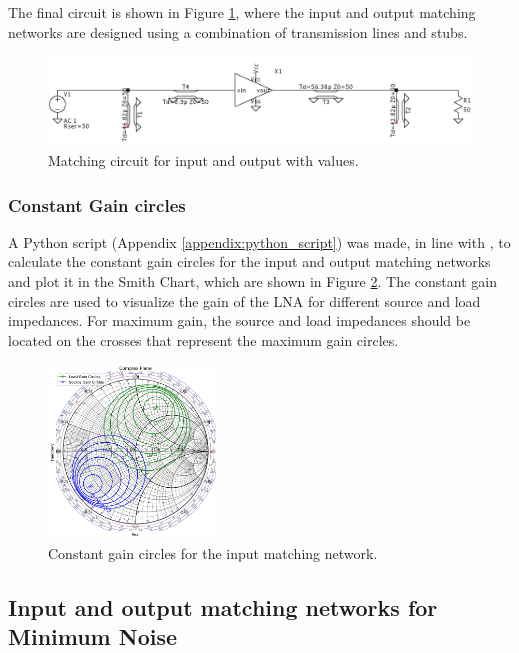 The final circuit is shown in Figure \ref{fig:MatchingCircuit-line}, where the input and output matching networks are designed using a combination of transmission lines and stubs.

\begin{figure}[h]
    \centering
    \includegraphics[width=1\textwidth]{Images/LS_matching-circuit.png}
    \caption{Matching circuit for input and output with values.}
    \label{fig:MatchingCircuit-line}
\end{figure}

\subsubsection{Constant Gain circles}

A Python script (Appendix \ref{appendix:python_script}) was made, in line with \cite{Gillermo-Gonzalez}, to calculate the constant gain circles for the input and output matching networks and plot it in the Smith Chart, which are shown in Figure \ref{fig:ConstantGainCircles}. The constant gain circles are used to visualize the gain of the LNA for different source and load impedances. For maximum gain, the source and load impedances should be located on the crosses that represent the maximum gain circles.
\begin{figure}[H]
    \centering
    \includegraphics[width=0.4\textwidth]{Images/ConstantGainCircles.png}
    \caption{Constant gain circles for the input matching network.}
    \label{fig:ConstantGainCircles}
\end{figure}

\subsection{Input and output matching networks for Minimum Noise}

